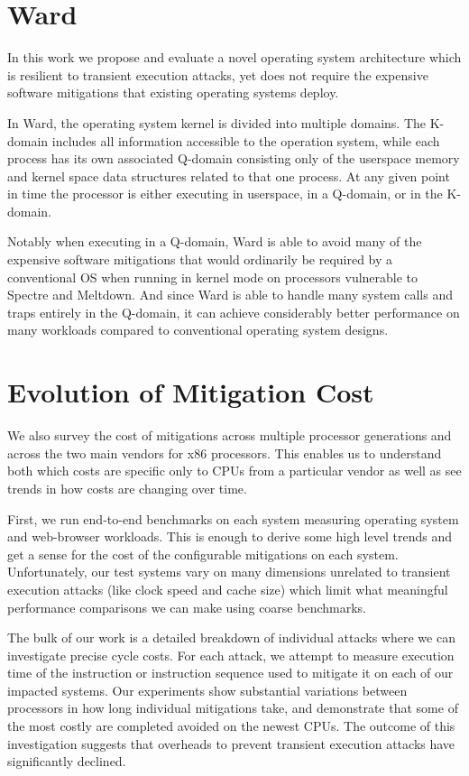 \section*{Ward}
In this work we propose and evaluate a novel operating system architecture which is resilient to transient execution attacks, yet does not require the expensive software mitigations that existing operating systems deploy. 

In Ward, the operating system kernel is divided into multiple domains.
The K-domain includes all information accessible to the operation system, while each process has its own associated Q-domain consisting only of the userspace memory and kernel space data structures related to that one process.
At any given point in time the processor is either executing in userspace, in a Q-domain, or in the K-domain. 

Notably when executing in a Q-domain, Ward is able to avoid many of the expensive software mitigations that would ordinarily be required by a conventional OS when running in kernel mode on processors vulnerable to Spectre and Meltdown.
And since Ward is able to handle many system calls and traps entirely in the Q-domain, it can achieve considerably better performance on many workloads compared to conventional operating system designs.

\section*{Evolution of Mitigation Cost}
We also survey the cost of mitigations across multiple processor generations and across the two main vendors for x86 processors.
This enables us to understand both which costs are specific only to CPUs from a particular vendor as well as see trends in how costs are changing over time.

First, we run end-to-end benchmarks on each system measuring operating system and web-browser workloads.
This is enough to derive some high level trends and get a sense for the cost of the configurable mitigations on each system.
Unfortunately, our test systems vary on many dimensions unrelated to transient execution attacks (like clock speed and cache size) which limit what meaningful performance comparisons we can make using coarse benchmarks.

The bulk of our work is a detailed breakdown of individual attacks where we can investigate precise cycle costs.
For each attack, we attempt to measure execution time of the instruction or instruction sequence used to mitigate it on each of our impacted systems.
Our experiments show substantial variations between processors in how long individual mitigations take, and demonstrate that some of the most costly are completed avoided on the newest CPUs. 
The outcome of this investigation suggests that overheads to prevent transient execution attacks have significantly declined.
